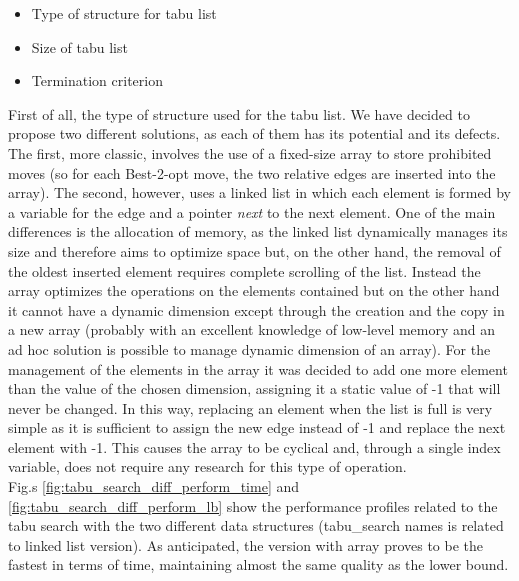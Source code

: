 \begin{itemize}
\item Type of structure for tabu list
\item Size of tabu list
\item Termination criterion
\end{itemize}

First of all, the type of structure used for the tabu list. We have decided to propose two different solutions, as each of them has its potential and its defects. The first, more classic, involves the use of a fixed-size array to store prohibited moves (so for each Best-2-opt move, the two relative edges are inserted into the array). The second, however, uses a linked list in which each element is formed by a variable for the edge and a pointer \textit{next} to the next element.
One of the main differences is the allocation of memory, as the linked list dynamically manages its size and therefore aims to optimize space but, on the other hand, the removal of the oldest inserted element requires complete scrolling of the list. Instead the array optimizes the operations on the elements contained but on the other hand it cannot have a dynamic dimension except through the creation and the copy in a new array (probably with an excellent knowledge of low-level memory and an ad hoc solution is possible to manage dynamic dimension of an array). For the management of the elements in the array it was decided to add one more element than the value of the chosen dimension, assigning it a static value of -1 that will never be changed. In this way, replacing an element when the list is full is very simple as it is sufficient to assign the new edge instead of -1 and replace the next element with -1. This causes the array to be cyclical and, through a single index variable, does not require any research for this type of operation.\\
Fig.s \ref{fig:tabu_search_diff_perform_time} and \ref{fig:tabu_search_diff_perform_lb} show the performance profiles related to the tabu search with the two different data structures (tabu\_search names is related to linked list version). As anticipated, the version with array proves to be the fastest in terms of time, maintaining almost the same quality as the lower bound. \\
